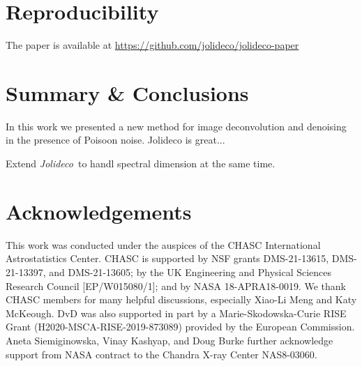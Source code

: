 \documentclass[twocolumn]{aastex631}
\newcommand{\jolideco}{\textit{Jolideco}~}
\begin{document}
    \section{Reproducibility}

    The paper is available at \url{https://github.com/jolideco/jolideco-paper}
    


    \section{Summary \& Conclusions}
    In this work we presented a new method for image deconvolution and denoising in the presence of Poisoon noise.
    Jolideco is great...

    Extend \jolideco to handl spectral dimension at the same time.

    \section*{Acknowledgements}
    This work was conducted under the auspices of the CHASC International Astrostatistics Center.
    CHASC is supported by NSF grants DMS-21-13615, DMS-21-13397, and DMS-21-13605; by the UK Engineering
    and Physical Sciences Research Council [EP/W015080/1]; and by NASA 18-APRA18-0019.
    We thank CHASC members for many helpful discussions, especially Xiao-Li Meng and Katy McKeough.
    DvD was also supported in part by a Marie-Skodowska-Curie RISE Grant (H2020-MSCA-RISE-2019-873089)
    provided by the European Commission.
    Aneta Siemiginowska, Vinay Kashyap, and Doug Burke further acknowledge support from NASA
    contract to the Chandra X-ray Center NAS8-03060.

    \newpage
    
\end{document}
